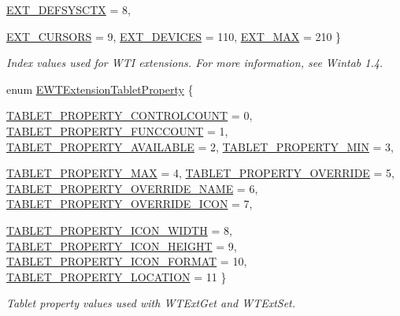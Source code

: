 \begin{DoxyCompactItemize}
\hyperlink{namespace_wintab_d_n_a52875c234488913934e0d49ac13c438d}{EXT\_\-DEFSYSCTX} =  8, 
\par
\hyperlink{namespace_wintab_d_n_a52875c234488913934e0d49ac13c438d}{EXT\_\-CURSORS} =  9, 
\hyperlink{namespace_wintab_d_n_a52875c234488913934e0d49ac13c438d}{EXT\_\-DEVICES} =  110, 
\hyperlink{namespace_wintab_d_n_a52875c234488913934e0d49ac13c438d}{EXT\_\-MAX} =  210
 \}
\begin{DoxyCompactList}\small\item\em Index values used for WTI extensions. For more information, see Wintab 1.4. \item\end{DoxyCompactList}\item 
enum \hyperlink{namespace_wintab_d_n_a21cb408997e6cbe0866e75b0fe0a743f}{EWTExtensionTabletProperty} \{ \par
\hyperlink{namespace_wintab_d_n_a21cb408997e6cbe0866e75b0fe0a743f}{TABLET\_\-PROPERTY\_\-CONTROLCOUNT} =  0, 
\hyperlink{namespace_wintab_d_n_a21cb408997e6cbe0866e75b0fe0a743f}{TABLET\_\-PROPERTY\_\-FUNCCOUNT} =  1, 
\hyperlink{namespace_wintab_d_n_a21cb408997e6cbe0866e75b0fe0a743f}{TABLET\_\-PROPERTY\_\-AVAILABLE} =  2, 
\hyperlink{namespace_wintab_d_n_a21cb408997e6cbe0866e75b0fe0a743f}{TABLET\_\-PROPERTY\_\-MIN} =  3, 
\par
\hyperlink{namespace_wintab_d_n_a21cb408997e6cbe0866e75b0fe0a743f}{TABLET\_\-PROPERTY\_\-MAX} =  4, 
\hyperlink{namespace_wintab_d_n_a21cb408997e6cbe0866e75b0fe0a743f}{TABLET\_\-PROPERTY\_\-OVERRIDE} =  5, 
\hyperlink{namespace_wintab_d_n_a21cb408997e6cbe0866e75b0fe0a743f}{TABLET\_\-PROPERTY\_\-OVERRIDE\_\-NAME} =  6, 
\hyperlink{namespace_wintab_d_n_a21cb408997e6cbe0866e75b0fe0a743f}{TABLET\_\-PROPERTY\_\-OVERRIDE\_\-ICON} =  7, 
\par
\hyperlink{namespace_wintab_d_n_a21cb408997e6cbe0866e75b0fe0a743f}{TABLET\_\-PROPERTY\_\-ICON\_\-WIDTH} =  8, 
\hyperlink{namespace_wintab_d_n_a21cb408997e6cbe0866e75b0fe0a743f}{TABLET\_\-PROPERTY\_\-ICON\_\-HEIGHT} =  9, 
\hyperlink{namespace_wintab_d_n_a21cb408997e6cbe0866e75b0fe0a743f}{TABLET\_\-PROPERTY\_\-ICON\_\-FORMAT} =  10, 
\hyperlink{namespace_wintab_d_n_a21cb408997e6cbe0866e75b0fe0a743f}{TABLET\_\-PROPERTY\_\-LOCATION} =  11
 \}
\begin{DoxyCompactList}\small\item\em Tablet property values used with WTExtGet and WTExtSet. \item\end{DoxyCompactList}\item 

\end{DoxyCompactItemize}
